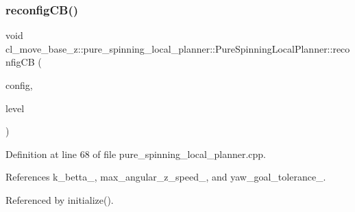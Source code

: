 \subsubsection{\texorpdfstring{reconfig\+C\+B()}{reconfigCB()}}
{\footnotesize\ttfamily void cl\+\_\+move\+\_\+base\+\_\+z\+::pure\+\_\+spinning\+\_\+local\+\_\+planner\+::\+Pure\+Spinning\+Local\+Planner\+::reconfig\+CB (\begin{DoxyParamCaption}\item[{\+::pure\+\_\+spinning\+\_\+local\+\_\+planner\+::\+Pure\+Spinning\+Local\+Planner\+Config \&}]{config,  }\item[{uint32\+\_\+t}]{level }\end{DoxyParamCaption})\hspace{0.3cm}{\ttfamily [private]}}



Definition at line 68 of file pure\+\_\+spinning\+\_\+local\+\_\+planner.\+cpp.



References k\+\_\+betta\+\_\+, max\+\_\+angular\+\_\+z\+\_\+speed\+\_\+, and yaw\+\_\+goal\+\_\+tolerance\+\_\+.



Referenced by initialize().


